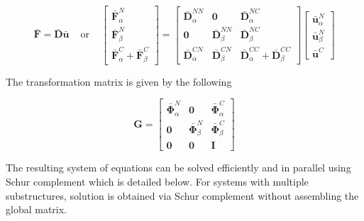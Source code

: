 \documentclass[../DomainDecomposition.tex]{subfiles}
\begin{document}
\begin{equation}
    \bar{\mathbf{F}}
    =
    \bar{\mathbf{D}} 
    \bar{\mathbf{u}} 
    \phantom{xx} 
    \text{or}
    \phantom{xx} 
    \begin{bmatrix}
        \bar{\mathbf{F}}_{\alpha}^{N} \\ 
        \bar{\mathbf{F}}_{\beta}^{N} \\ 
        \bar{\mathbf{F}}_{\alpha}^{C} + 
        \bar{\mathbf{F}}_{\beta}^{C} 
    \end{bmatrix}
    =
    \begin{bmatrix}
        \bar{\mathbf{D}}_{\alpha}^{NN} & 
        \mathbf{0} & 
        \bar{\mathbf{D}}_{\alpha}^{NC} \\ 
        \mathbf{0} & 
        \bar{\mathbf{D}}_{\beta}^{NN} & 
        \bar{\mathbf{D}}_{\beta}^{NC} \\ 
        \bar{\mathbf{D}}_{\alpha}^{CN} & 
        \bar{\mathbf{D}}_{\beta}^{CN} & 
        \bar{\mathbf{D}}_{\alpha}^{CC} + 
        \bar{\mathbf{D}}_{\beta}^{CC} 
    \end{bmatrix}
    \begin{bmatrix}
        \bar{\mathbf{u}}_{\alpha}^{N} \\ 
        \bar{\mathbf{u}}_{\beta}^{N} \\ 
        \bar{\mathbf{u}}^{C} 
    \end{bmatrix}
\label{Modal SoE} 
\end{equation}


The transformation matrix is given by the following 

\begin{equation}
    \mathbf{G} 
    = 
    \begin{bmatrix}
        \bar{\mathbf{\Phi}}_{\alpha}^{N} & 
        \mathbf{0} & 
        \bar{\mathbf{\Phi}}_{\alpha}^{C} \\
        \mathbf{0} & 
        \bar{\mathbf{\Phi}}_{\beta}^{N} & 
        \bar{\mathbf{\Phi}}_{\beta}^{C} \\
        \mathbf{0} & 
        \mathbf{0} & 
        \mathbf{I} 
    \end{bmatrix}
\end{equation}

The resulting system of equations can be solved efficiently and in parallel using Schur complement which is detailed below. 
For systems with multiple substructures, solution is obtained via Schur complement without assembling the global matrix. 
\end{document}
